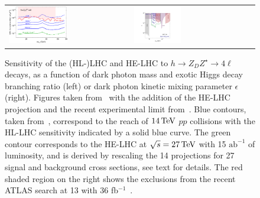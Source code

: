 \begin{figure}
\begin{tabular}{m{} m{}}
\includegraphics[width=0.5\textwidth]{section9/plots/zzdbrplot}
&
\includegraphics[width=0.4\textwidth]{section9/plots/new_zzdplot_epsilon}
\end{tabular}
\caption{
Sensitivity of the (HL-)LHC and HE-LHC to  $h \to Z_D Z^{\star} \to 4 \ell$ decays, as a function of dark photon mass and exotic Higgs decay branching ratio (left) or dark photon kinetic mixing parameter $\epsilon$ (right). Figures taken from~\cite{Curtin:2014cca} with the addition of the HE-LHC projection and the recent experimental limit from~\cite{Aaboud:2018fvk}.
%
 Blue contours, taken from~\cite{Curtin:2014cca}, correspond to the reach of $14 \,\text{Te\hspace{-.08em}V}$ $pp$ collisions with the HL-LHC sensitivity indicated by a solid blue curve. The green contour corresponds to the HE-LHC at $\sqrt{s} = 27 \,\text{Te\hspace{-.08em}V}$ with 15 $\mathrm{ab}^{-1}$ of luminosity, and is derived by rescaling the 14 \UTeV projections for 27 \UTeV signal and background cross sections, see text for details. The red shaded region on the right shows the exclusions from the recent ATLAS search at 13 \UTeV with 36 fb$^{-1}$~\cite{Aaboud:2018fvk}.
}
\label{f.darkphotonZZD}
\end{figure}



